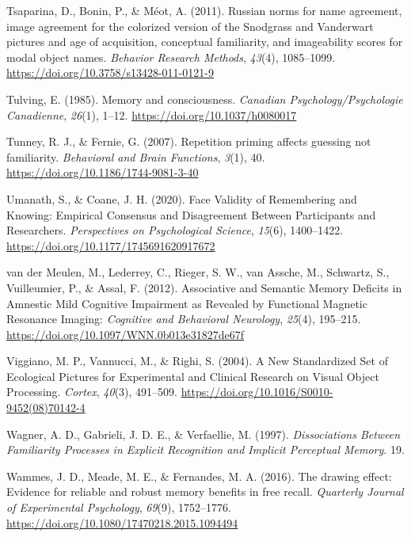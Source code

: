 \documentclass[
  11pt,
]{article}
\begin{document}
\leavevmode\hypertarget{ref-tsaparina2011}{}%
Tsaparina, D., Bonin, P., \& Méot, A. (2011). Russian norms for name
agreement, image agreement for the colorized version of the Snodgrass
and Vanderwart pictures and age of acquisition, conceptual familiarity,
and imageability scores for modal object names. \emph{Behavior Research
Methods}, \emph{43}(4), 1085--1099.
\url{https://doi.org/10.3758/s13428-011-0121-9}

\leavevmode\hypertarget{ref-tulving1985}{}%
Tulving, E. (1985). Memory and consciousness. \emph{Canadian
Psychology/Psychologie Canadienne}, \emph{26}(1), 1--12.
\url{https://doi.org/10.1037/h0080017}

\leavevmode\hypertarget{ref-tunney2007}{}%
Tunney, R. J., \& Fernie, G. (2007). Repetition priming affects guessing
not familiarity. \emph{Behavioral and Brain Functions}, \emph{3}(1), 40.
\url{https://doi.org/10.1186/1744-9081-3-40}

\leavevmode\hypertarget{ref-umanath2020}{}%
Umanath, S., \& Coane, J. H. (2020). Face Validity of Remembering and
Knowing: Empirical Consensus and Disagreement Between Participants and
Researchers. \emph{Perspectives on Psychological Science}, \emph{15}(6),
1400--1422. \url{https://doi.org/10.1177/1745691620917672}

\leavevmode\hypertarget{ref-vandermeulen2012}{}%
van der Meulen, M., Lederrey, C., Rieger, S. W., van Assche, M.,
Schwartz, S., Vuilleumier, P., \& Assal, F. (2012). Associative and
Semantic Memory Deficits in Amnestic Mild Cognitive Impairment as
Revealed by Functional Magnetic Resonance Imaging: \emph{Cognitive and
Behavioral Neurology}, \emph{25}(4), 195--215.
\url{https://doi.org/10.1097/WNN.0b013e31827de67f}

\leavevmode\hypertarget{ref-viggiano2004}{}%
Viggiano, M. P., Vannucci, M., \& Righi, S. (2004). A New Standardized
Set of Ecological Pictures for Experimental and Clinical Research on
Visual Object Processing. \emph{Cortex}, \emph{40}(3), 491--509.
\url{https://doi.org/10.1016/S0010-9452(08)70142-4}

\leavevmode\hypertarget{ref-wagner1997}{}%
Wagner, A. D., Gabrieli, J. D. E., \& Verfaellie, M. (1997).
\emph{Dissociations Between Familiarity Processes in Explicit
Recognition and Implicit Perceptual Memory}. 19.

\leavevmode\hypertarget{ref-wammes2016}{}%
Wammes, J. D., Meade, M. E., \& Fernandes, M. A. (2016). The drawing
effect: Evidence for reliable and robust memory benefits in free recall.
\emph{Quarterly Journal of Experimental Psychology}, \emph{69}(9),
1752--1776. \url{https://doi.org/10.1080/17470218.2015.1094494}
\end{document}
